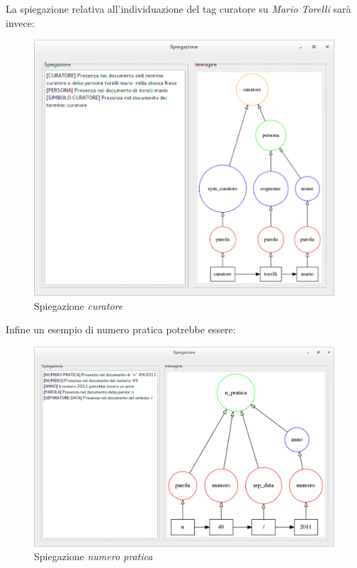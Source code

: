 La spiegazione relativa all'individuazione del tag curatore su \emph{Mario Torelli} sarà invece:

\begin{figure}[H]
	\includegraphics[width=1\textwidth]{img/interfaces/java-curatore.png}
	\caption[Schermata java explain curatore]{Spiegazione \emph{curatore}}
	\label{java-curatore}
\end{figure}

Infine un esempio di numero pratica potrebbe essere:

\begin{figure}[H]
	\includegraphics[width=1\textwidth]{img/interfaces/java-pratica.png}
	\caption[Schermata java explain numero pratica]{Spiegazione \emph{numero pratica}}
	\label{java-pratica}
\end{figure}


